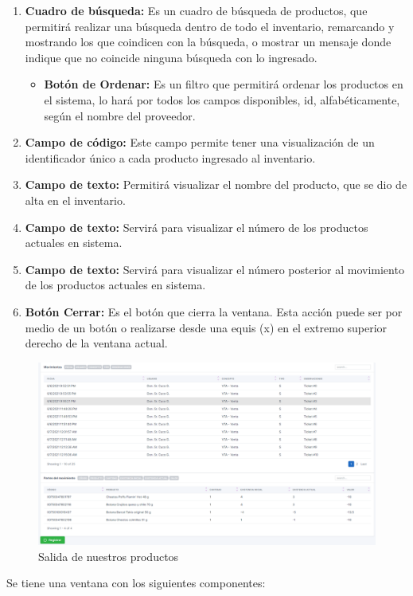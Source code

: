 \documentclass[a4paper,DIV=12]{scrreprt}
\begin{document}
\begin{enumerate}
	\item{\textbf{Cuadro de búsqueda:} Es un cuadro de búsqueda de productos, que permitirá realizar una búsqueda dentro de todo el inventario, remarcando y mostrando los que coindicen con la búsqueda, o mostrar un mensaje donde indique que no coincide ninguna búsqueda con lo ingresado.  }	
	\begin{itemize}
		\item{\textbf{Botón de Ordenar:} Es un filtro que permitirá ordenar los productos en el sistema, lo hará por todos los campos disponibles, id, alfabéticamente, según el nombre del proveedor. }
	\end{itemize}

	\item{\textbf{Campo de código:} Este campo permite tener una visualización de un identificador único a cada producto ingresado al inventario.}	
	\item{\textbf{Campo de texto:} Permitirá visualizar el nombre del producto, que se dio de alta en el inventario.}			
		
		
	\item{\textbf{Campo de texto:} Servirá para visualizar el número de los productos actuales en sistema.}	
	\item{\textbf{Campo de texto:} Servirá para visualizar el número posterior al movimiento de los productos actuales en sistema.}	
	
	\item{\textbf{Botón Cerrar:} Es el botón que cierra la ventana. Esta acción puede ser por medio de un botón o realizarse desde una equis (x) en el extremo superior derecho de la ventana actual.}	
\end{enumerate}
		\begin{figure}[h!]
		\centering
		\includegraphics[scale=0.4]{SALIDAS.PNG}
		\caption{Salida de nuestros productos}
	\end{figure}
	Se tiene una ventana con los siguientes componentes: 
\end{document}
